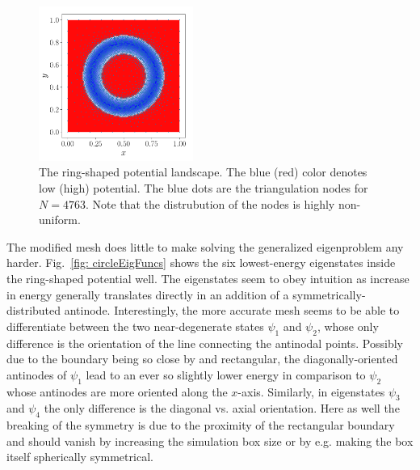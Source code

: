 \documentclass[a4paper,12pt]{article}
\begin{document}
\begin{figure}
\vspace{-20pt}
\hspace{-30pt}
\begin{center}
\includegraphics[width=0.45\textwidth]{../figs/circle_pot.pdf}
\caption{The ring-shaped potential landscape. The blue (red) color denotes low (high) potential. The blue dots are the triangulation nodes for $N=4763$. Note that the distrubution of the nodes is highly non-uniform. }
\label{fig: circlePot}
\end{center}
\end{figure}

The modified mesh does little to make solving the generalized eigenproblem any harder. Fig.~\ref{fig: circleEigFuncs} shows the six lowest-energy eigenstates inside the ring-shaped potential well. The eigenstates seem to obey intuition as increase in energy generally translates directly in an addition of a symmetrically-distributed antinode. Interestingly, the more accurate mesh seems to be able to differentiate between the two near-degenerate states $\psi_1$ and $\psi_2$, whose only difference is the orientation of the line connecting the antinodal points. Possibly due to the boundary being so close by and rectangular, the diagonally-oriented antinodes of $\psi_1$ lead to an ever so slightly lower energy in comparison to $\psi_2$ whose antinodes are more oriented along the $x$-axis. Similarly, in eigenstates $\psi_3$ and $\psi_4$ the only difference is the diagonal vs. axial orientation. Here as well the breaking of the symmetry is due to the proximity of the rectangular boundary and should vanish by increasing the simulation box size or by e.g. making the box itself spherically symmetrical.
\end{document}
